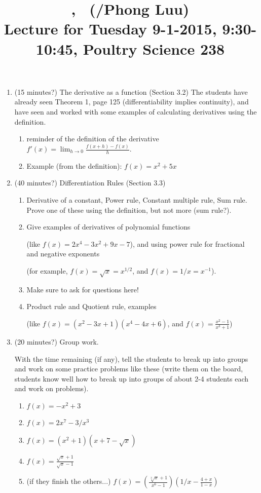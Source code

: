 \documentclass[12pt]{amsart}
\title{\course, \semester\ (\instructor/Phong Luu) \\ Lecture for Tuesday
9-1-2015, 9:30-10:45, Poultry Science 238}
\begin{document}
\maketitle

\begin{enumerate}[1. ]
\setlength{\itemsep}{1cm}
\item (15 minutes?)
The derivative as a function (Section 3.2)
{\color{blue}The students have already seen Theorem 1, page 125
(differentiability implies continuity), and have seen and worked with
some examples of calculating derivatives using the definition.}
\begin{enumerate}[ i. ]
\item
reminder of the definition of the derivative $\displaystyle f'(x) = \lim_{h
\to 0} \frac{f(x + h) - f(x)}{h}$.
\item
Example (from the definition): $\displaystyle f(x) = {x^2 + 5x}$
\end{enumerate}

\item (40 minutes?)
Differentiation Rules (Section 3.3)
\begin{enumerate}[ i. ]
\item
Derivative of a constant, Power rule, Constant multiple rule, Sum rule.
Prove one of these using the definition, but not more (sum rule?).
\item
Give examples of derivatives of polynomial functions 

(like $f(x) = 2x^4 -
3x^2 + 9x - 7$), and using power rule for fractional and negative exponents

(for example, $f(x) = \sqrt x = x^{1/2}$, and $f(x) = 1/x = x^{-1}$).
\item
Make sure to ask for questions here!
\item
Product rule and Quotient rule, examples 

(like $f(x) = (x^2 - 3x + 1)(x^4 -
4x + 6)$, and 
$\displaystyle f(x) = \frac{x^2 - 1}{x^3 + 1}$)
\end{enumerate}

\item (20 minutes?)
Group work.

With the time remaining (if any), tell the students to break up into groups
and work on some practice problems like these (write them on the board,
students know well how to break up into groups of about 2-4 students each
and work on problems).
\begin{enumerate}[ i. ]
\item
$f(x) = -x^2 + 3$
\item
$f(x) = 2x^7 - 3/x^3$
\item
$f(x) = (x^2 + 1)(x + 7 - \sqrt x)$
\item
$f(x) = \frac{\sqrt x + 1}{\sqrt x - 1}$
\item (if they finish the others...)
$\displaystyle f(x) = \left(\frac{\sqrt[3] x + 1}{x^6 - 1}\right)\left(1/x
- \frac{4 + x}{1 - x}\right)$
\end{enumerate}


\end{enumerate}
\end{document}
